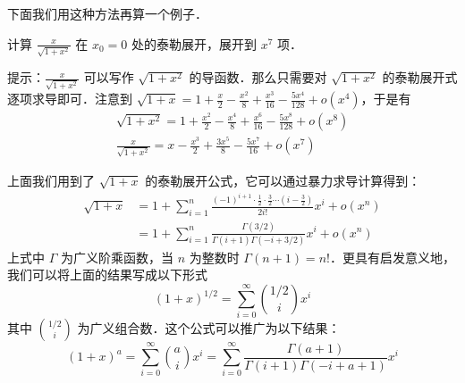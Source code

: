 下面我们用这种方法再算一个例子．
\begin{exercise}{}
计算 $\frac{x}{\sqrt{1+x^2}}$ 在 $x_0=0$ 处的泰勒展开，展开到 $x^7$ 项．
\end{exercise}
提示：$\frac{x}{\sqrt{1+x^2}}$ 可以写作 $\sqrt{1+x^2}$ 的导函数．那么只需要对 $\sqrt{1+x^2}$ 的泰勒展开式逐项求导即可．注意到 $\sqrt{1+x}=1+\frac{x}{2}-\frac{x^2}{8}+\frac{x^3}{16}-\frac{5x^4}{128}+o(x^4)$，于是有
\begin{equation}
\begin{aligned}
\sqrt{1+x^2}=1+\frac{x^2}{2}-\frac{x^4}{8}+\frac{x^6}{16}-\frac{5x^8}{128}+o(x^8)\\
\frac{x}{\sqrt{1+x^2}}=x-\frac{x^3}{2}+\frac{3x^5}{8}-\frac{5x^7}{16}+o(x^7)
\end{aligned}
\end{equation}

上面我们用到了 $\sqrt{1+x}$ 的泰勒展开公式，它可以通过暴力求导计算得到：
\begin{equation}
\begin{aligned}
\sqrt{1+x}&=1+\sum_{i=1}^n\frac{(-1)^{i+1} \cdot \frac{1}{2}\cdot \frac{3}{2}\cdots (i-\frac{3}{2})}{2i!}x^i +o(x^n)\\
&=1+\sum_{i=1}^n\frac{\Gamma(3/2)}{\Gamma(i+1)\Gamma(-i+3/2)}x^i +o(x^n)
\end{aligned}
\end{equation}
上式中 $\Gamma$ 为广义阶乘函数，当 $n$ 为整数时 $\Gamma(n+1)=n!$．更具有启发意义地，我们可以将上面的结果写成以下形式
\begin{equation}
(1+x)^{1/2}=\sum_{i=0}^{\infty}{1/2\choose i}x^i
\end{equation}
其中 ${1/2\choose i}$ 为广义组合数．这个公式可以推广为以下结果：
\begin{equation}
(1+x)^{a}=\sum_{i=0}^{\infty}{a\choose i}x^i=\sum_{i=0}^{\infty}\frac{\Gamma(a+1)}{\Gamma(i+1)\Gamma(-i+a+1)}x^i
\end{equation}

